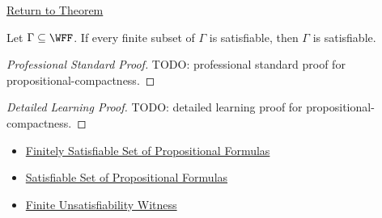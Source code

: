 \newpage
{}
\label{prf:propositional-compactness}

\begin{remark*}[Return]
\hyperref[thm:propositional-compactness]{Return to Theorem}
\end{remark*}

\begin{theorem*}
Let \(\Gamma\subseteq\WFF\). If every finite subset of \(\Gamma\) is
satisfiable, then \(\Gamma\) is satisfiable.

\medskip
\end{theorem*}

\begin{proof}[Professional Standard Proof]
\LRAProofBodyStart
TODO: professional standard proof for propositional-compactness.
\end{proof}

\begin{proof}[Detailed Learning Proof]
\LRAProofBodyStart
TODO: detailed learning proof for propositional-compactness.
\end{proof}

\begin{remark*}
\end{remark*}

\begin{dependencies}
\begin{itemize}
  \item \hyperref[def:finitely-satisfiable-set-of-propositional-formulas]{Finitely Satisfiable Set of Propositional Formulas}
  \item \hyperref[def:satisfiable-set-of-propositional-formulas]{Satisfiable Set of Propositional Formulas}
  \item \hyperref[def:finite-unsatisfiability-witness-propositional-logic]{Finite Unsatisfiability Witness}
\end{itemize}
\end{dependencies}

\clearpage
